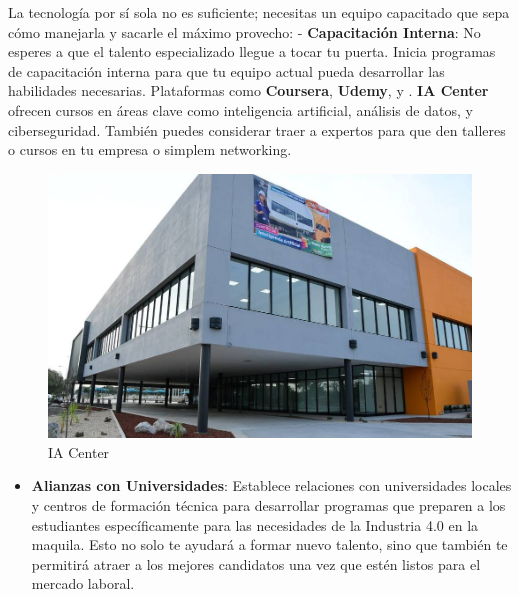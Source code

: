\documentclass[
  letterpaper,
]{book}
\providecommand{\tightlist}{%
  \setlength{\itemsep}{0pt}\setlength{\parskip}{0pt}}\usepackage{longtable,booktabs,array}
\begin{document}
La tecnología por sí sola no es suficiente; necesitas un equipo
capacitado que sepa cómo manejarla y sacarle el máximo provecho: -
\textbf{Capacitación Interna}: No esperes a que el talento especializado
llegue a tocar tu puerta. Inicia programas de capacitación interna para
que tu equipo actual pueda desarrollar las habilidades necesarias.
Plataformas como \textbf{Coursera}, \textbf{Udemy}, y . \textbf{IA
Center} ofrecen cursos en áreas clave como inteligencia artificial,
análisis de datos, y ciberseguridad. También puedes considerar traer a
expertos para que den talleres o cursos en tu empresa o simplem
networking.

\begin{figure}[H]

{\centering \includegraphics{Img/iacenter.jpeg}

}

\caption{IA Center}

\end{figure}%

\begin{itemize}
\tightlist
\item
  \textbf{Alianzas con Universidades}: Establece relaciones con
  universidades locales y centros de formación técnica para desarrollar
  programas que preparen a los estudiantes específicamente para las
  necesidades de la Industria 4.0 en la maquila. Esto no solo te ayudará
  a formar nuevo talento, sino que también te permitirá atraer a los
  mejores candidatos una vez que estén listos para el mercado laboral.
\end{itemize}
\end{document}
